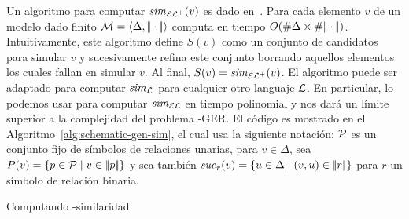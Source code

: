 Un algoritmo para computar ${\it sim}_{{\mathcal{EL}^+}}(v)$ es dado en~\cite{HHK95}. Para cada
elemento $v$ de un modelo dado finito
$\mathcal{M}=\langle \Delta,|\!|\cdot|\!| \rangle$
computa en tiempo $O(\# \Delta\times\# {|\!|\cdot|\!|})$.
Intuitivamente, este algoritmo
define $S(v)$ como un conjunto de candidatos para simular $v$ y
sucesivamente refina este conjunto borrando aquellos elementos los cuales fallan en simular $v$.
Al final, $S(v)={\it sim}_{\mathcal{EL}^+}(v)$. El algoritmo puede ser adaptado para
computar ${\it sim}_{\mathcal{L}}$ para cualquier otro languaje $\mathcal{L}$. En particular,
lo podemos usar para computar ${\it sim}_\mathcal{EL}$ en tiempo polinomial y nos dar\'a un l\'imite superior a la
complejidad del problema \EL-GER. 
El c\'odigo es mostrado en el
Algoritmo~\ref{alg:schematic-gen-sim}, el cual usa la siguiente
notaci\'on: $\mathcal{P}$ es un conjunto fijo de s\'imbolos de relaciones unarias, para $v\in
\Delta$, sea $P(v)=\{p\in\mathcal{P}\mid v\in|\!|p|\!|\}$ y sea tambi\'en
${\it suc}_{r}(v)=\{u\in\Delta\mid(v,u)\in|\!|r|\!|\}$ para $r$ un s\'imbolo de relaci\'on binaria.





\begin{algorithm}
\small
\caption{ Computando \EL-similaridad\label{alg:schematic-gen-sim}}
 \BlankLine


\end{algorithm}



